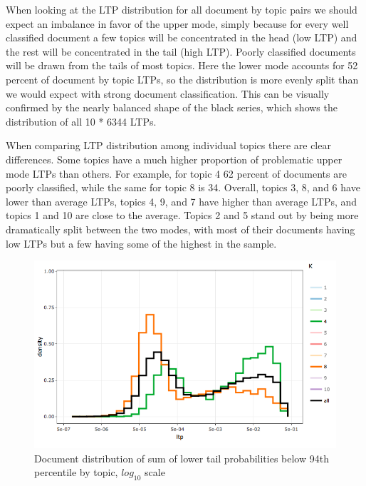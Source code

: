 \documentclass[]{book}
\theoremstyle{definition}
\theoremstyle{definition}
\theoremstyle{definition}
\theoremstyle{remark}
\begin{document}
When looking at the LTP distribution for all document by topic pairs we
should expect an imbalance in favor of the upper mode, simply because
for every well classified document a few topics will be concentrated in
the head (low LTP) and the rest will be concentrated in the tail (high
LTP). Poorly classified documents will be drawn from the tails of most
topics. Here the lower mode accounts for 52 percent of document by topic
LTPs, so the distribution is more evenly split than we would expect with
strong document classification. This can be visually confirmed by the
nearly balanced shape of the black series, which shows the distribution
of all 10 * 6344 LTPs.

When comparing LTP distribution among individual topics there are clear
differences. Some topics have a much higher proportion of problematic
upper mode LTPs than others. For example, for topic 4 62 percent of
documents are poorly classified, while the same for topic 8 is 34.
Overall, topics 3, 8, and 6 have lower than average LTPs, topics 4, 9,
and 7 have higher than average LTPs, and topics 1 and 10 are close to
the average. Topics 2 and 5 stand out by being more dramatically split
between the two modes, with most of their documents having low LTPs but
a few having some of the highest in the sample.

\begin{figure}

{\centering \includegraphics[width=0.9\linewidth]{img/k10headtail} 

}

\caption{Document distribution of sum of lower tail probabilities below 94th percentile by topic, $log_{10}$ scale}\label{fig:k10headtailp}
\end{figure}
\end{document}
